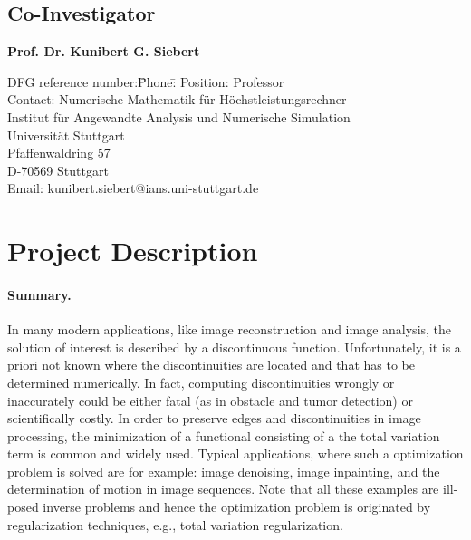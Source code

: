 \documentclass[enabledeprecatedfontcommands,cleardoublepage=empty,headsepline,twoside,11pt,DIV=15,BCOR=12mm,final]{scrartcl}
\begin{document}
\subsection*{Co-Investigator}

\begin{flushleft}
  \textbf{Prof. Dr. Kunibert G. Siebert}
  \begin{tabbing}
    DFG reference number:\quad\=Phone:\quad\=\kill
    Position:\> Professor\\
    Contact:\> Numerische Mathematik f\"ur H\"ochstleistungsrechner\\ 
    \>Institut f\"ur Angewandte Analysis und Numerische Simulation\\
    \> Universit\"at Stuttgart\\
    \> Pfaffenwaldring 57 \\
    \> D-70569 Stuttgart\\[1mm]
    \> Email:\> kunibert.siebert@ians.uni-stuttgart.de\\[1mm]
 \end{tabbing}
\end{flushleft}
\section*{Project Description}

\paragraph{Summary.} 

In many modern applications, like image reconstruction and image analysis, the solution of interest is described by a discontinuous function. Unfortunately, it is a priori not known where the discontinuities  are located and that has to be determined numerically. In fact, computing discontinuities wrongly or inaccurately could be either fatal (as in obstacle and tumor detection) or scientifically costly.  %
In order to preserve edges and discontinuities  in image processing, the minimization of a functional consisting of a the total variation term is common and widely used. Typical applications, where such a optimization problem is solved are for example: image denoising, image inpainting, and the determination of motion in image sequences. Note that all these examples are ill-posed inverse problems and hence the optimization problem is originated by regularization techniques, e.g., total variation regularization.
\end{document}
